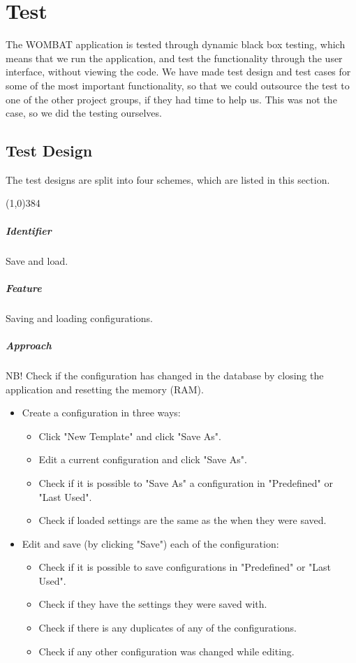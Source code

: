 \chapter{Test}
\label{cha:test}
The WOMBAT application is tested through dynamic black box testing, which means that we run the application, and test the functionality through the user interface, without viewing the code. We have made test design and test cases for some of the most important functionality, so that we could outsource the test to one of the other project groups, if they had time to help us. This was not the case, so we did the testing ourselves.

\section{Test Design}
\label{sec:test_design}
The test designs are split into four schemes, which are listed in this section.

\begin{center}
	\line(1,0){384}
\end{center}
\paragraph{Identifier}
	Save and load.
\paragraph{Feature}
	Saving and loading configurations.
\paragraph{Approach}
	NB! Check if the configuration has changed in the database by closing the application and resetting the memory (RAM).
		\begin{itemize} 
			\item Create a configuration in three ways:
				\begin{itemize}
					\item Click "New Template" and click "Save As".
					\item Edit a current configuration and click "Save As".
					\item Check if it is possible to "Save As" a configuration in "Predefined" or "Last Used".
					\item Check if loaded settings are the same as the when they were saved. 
				\end{itemize}
			\item Edit and save (by clicking "Save") each of the configuration:
		\begin{itemize}
			\item Check if it is possible to save configurations in "Predefined" or "Last Used".
			\item Check if they have the settings they were saved with.
			\item Check if there is any duplicates of any of the configurations.
			\item Check if any other configuration was changed while editing.	
		\end{itemize}
	\end{itemize}
